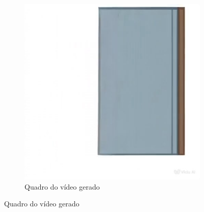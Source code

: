 \begin{figure}[htbp]
\begin{subfigure}{0.42\linewidth}
        \label{fig:vidu14a}
    \end{subfigure}
    \begin{subfigure}{0.42\linewidth}
        \includegraphics[width=1\linewidth]{figs/vidu/frame14.jpg}
        \caption{\small Quadro do vídeo gerado}
        \label{fig:vidu14b}
    \end{subfigure}
\end{figure}

